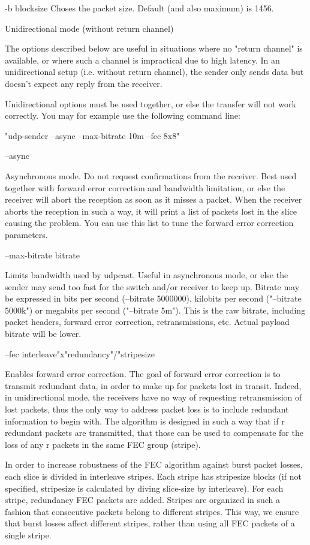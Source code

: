 -b blocksize
    Choses the packet size. Default (and also maximum) is 1456.


Unidirectional mode (without return channel)

The options described below are useful in situations where no "return
channel" is available, or where such a channel is impractical due to high
latency. In an unidirectional setup (i.e. without return channel), the
sender only sends data but doesn't expect any reply from the receiver.

Unidirectional options must be used together, or else the transfer will not
work correctly. You may for example use the following command line:

"udp-sender --async --max-bitrate 10m --fec 8x8"

--async

    Asynchronous mode. Do not request confirmations from the receiver. Best
used together with forward error correction and bandwidth limitation, or
else the receiver will abort the reception as soon as it misses a packet.
When the receiver aborts the reception in such a way, it will print a list
of packets lost in the slice causing the problem. You can use this list to
tune the forward error correction parameters. 

--max-bitrate bitrate

    Limits bandwidth used by udpcast. Useful in asynchronous mode, or else
the sender may send too fast for the switch and/or receiver to keep up.
Bitrate may be expressed in bits per second (--bitrate 5000000), kilobits
per second ("--bitrate 5000k") or megabits per second ("--bitrate 5m").
This is the raw bitrate, including packet headers, forward error
correction, retransmissions, etc. Actual payload bitrate will be lower. 

--fec interleave"x"redundancy"/"stripesize

    Enables forward error correction. The goal of forward error correction
is to transmit redundant data, in order to make up for packets lost in
transit. Indeed, in unidirectional mode, the receivers have no way of
requesting retransmission of lost packets, thus the only way to address
packet loss is to include redundant information to begin with. The
algorithm is designed in such a way that if r redundant packets are
transmitted, that those can be used to compensate for the loss of any r
packets in the same FEC group (stripe).

    In order to increase robustness of the FEC algorithm against burst
packet losses, each slice is divided in interleave stripes. Each stripe has
stripesize blocks (if not specified, stripesize is calculated by diving
slice-size by interleave). For each stripe, redundancy FEC packets are
added. Stripes are organized in such a fashion that consecutive packets
belong to different stripes. This way, we ensure that burst losses affect
different stripes, rather than using all FEC packets of a single stripe.

